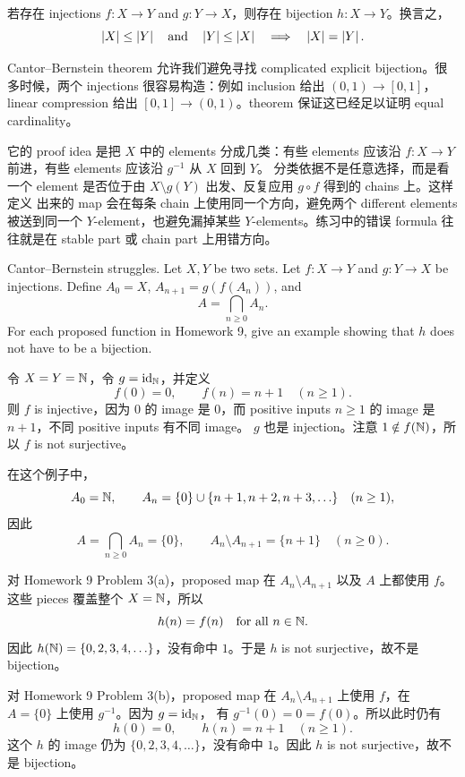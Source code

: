 \begin{theorem}
若存在 injections \(f:X\to Y\) and \(g:Y\to X\)，则存在 bijection
\(h:X\to Y\)。换言之，
\[
  \left|X\right|\le\left|Y\right|
  \quad\text{and}\quad
  \left|Y\right|\le\left|X\right|
  \quad\Longrightarrow\quad
  \left|X\right|=\left|Y\right|.
\]
\end{theorem}

\begin{explanation}
Cantor--Bernstein theorem 允许我们避免寻找 complicated explicit
bijection。很多时候，两个 injections 很容易构造：例如 inclusion 给出
\((0,1)\to[0,1]\)，linear compression 给出 \([0,1]\to(0,1)\)。theorem
保证这已经足以证明 equal cardinality。

它的 proof idea 是把 \(X\) 中的 elements 分成几类：有些 elements 应该沿
\(f:X\to Y\) 前进，有些 elements 应该沿 \(g^{-1}\) 从 \(X\) 回到 \(Y\)。
分类依据不是任意选择，而是看一个 element 是否位于由
\(X\setminus g(Y)\) 出发、反复应用 \(g\circ f\) 得到的 chains 上。这样定义
出来的 map 会在每条 chain 上使用同一个方向，避免两个 different elements
被送到同一个 \(Y\)-element，也避免漏掉某些 \(Y\)-elements。练习中的错误
formula 往往就是在 stable part 或 chain part 上用错方向。
\end{explanation}

\begin{exerciseblock}
Cantor--Bernstein struggles. Let \(X,Y\) be two sets. Let \(f:X\to Y\) and
\(g:Y\to X\) be injections. Define \(A_0=X\), \(A_{n+1}=g(f(A_n))\), and
\[
  A=\bigcap_{n\ge 0} A_n.
\]
For each proposed function in Homework 9, give an example showing that \(h\)
does not have to be a bijection.
\end{exerciseblock}

\begin{solution}
令 \(X=Y=\mathbb{N}\)，令 \(g=\mathrm{id}_{\mathbb{N}}\)，并定义
\[
  f(0)=0,\qquad f(n)=n+1\quad(n\ge 1).
\]
则 \(f\) is injective，因为 \(0\) 的 image 是 \(0\)，而 positive inputs
\(n\ge 1\) 的 image 是 \(n+1\)，不同 positive inputs 有不同 image。
\(g\) 也是 injection。注意 \(1\notin f(\mathbb{N})\)，所以 \(f\) is not
surjective。

在这个例子中，
\[
  A_0=\mathbb{N},\qquad
  A_n=\{0\}\cup\{n+1,n+2,n+3,\ldots\}\quad(n\ge 1),
\]
因此
\[
  A=\bigcap_{n\ge 0}A_n=\{0\},
  \qquad
  A_n\setminus A_{n+1}=\{n+1\}\quad(n\ge 0).
\]

对 Homework 9 Problem 3(a)，proposed map 在 \(A_n\setminus A_{n+1}\)
以及 \(A\) 上都使用 \(f\)。这些 pieces 覆盖整个 \(X=\mathbb{N}\)，所以
\[
  h(n)=f(n)\quad\text{for all }n\in\mathbb{N}.
\]
因此 \(h(\mathbb{N})=\{0,2,3,4,\ldots\}\)，没有命中 \(1\)。于是 \(h\) is not
surjective，故不是 bijection。

对 Homework 9 Problem 3(b)，proposed map 在 \(A_n\setminus A_{n+1}\)
上使用 \(f\)，在 \(A=\{0\}\) 上使用 \(g^{-1}\)。因为 \(g=\mathrm{id}_{\mathbb{N}}\)，
有 \(g^{-1}(0)=0=f(0)\)。所以此时仍有
\[
  h(0)=0,\qquad h(n)=n+1\quad(n\ge 1).
\]
这个 \(h\) 的 image 仍为 \(\{0,2,3,4,\ldots\}\)，没有命中 \(1\)。因此
\(h\) is not surjective，故不是 bijection。
\end{solution}

